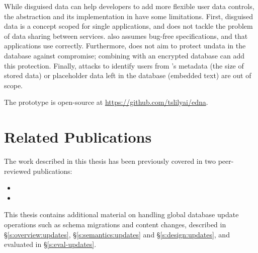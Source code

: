 %
While disguised data can help developers to add more flexible user data
controls, the abstraction and its implementation in \sys have some limitations. 
%
First, disguised data is a concept scoped for single applications, and does not
tackle the problem of data sharing between services.
%
%
\sys also assumes bug-free \xx specifications, and that applications use \sys
correctly.
%
Furthermore, \sys does not aim to protect un\xxed data in the database against compromise;
combining \sys with an encrypted database can add this protection.
%
Finally, attacks to identify users from \sys's metadata (\eg the size of
stored \xxed data) or placeholder data left in the database (\eg embedded text)
are out of scope.
%

The \sys prototype is open-source at \url{https://github.com/tslilyai/edna}.

\section{Related Publications}
The work described in this thesis has been previously covered in two
peer-reviewed publications:

\begin{itemize}
    \item {}
    \item {}
\end{itemize}
%
This thesis contains additional material on handling global database update
operations such as schema migrations and content changes, described in
\S\ref{s:overview:updates}, \S\ref{s:semantics:updates} and \S\ref{s:design:updates}, and evaluated
in \S\ref{s:eval-updates}.

\iffalse
\section{Remaining Work: Revealing with Schema Migrations and Application
Updates}

In \sys's current design, \textbf{global database updates} that implicitly enforce
invariants on application data remain unknown (and thus uncheckable) by \sys.
\sys also fails to reveal disguised data affected by \textbf{schema migrations}
performed since the time of disguise.
%
We will add an API for developers to log important updates and schema migrations with \sys, which \sys will apply to disguised data prior to restoring it to the database.

\sys will apply these updates or schema migrations prior to performing \sys's
existing consistency checks; these checks enable \sys to detect if revealing
transformations will violate referential integrity or other structural database
invariants (\eg uniqueness requirements). 

\fi
